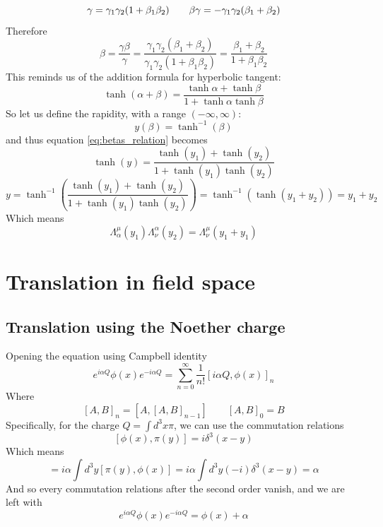 \documentclass{article}
\begin{document}
\begin{equation}
    \gamma = \gamma_1\gamma_2(1 + \beta_1\beta_2) \qquad \-\beta\gamma = -\gamma_1\gamma_2(\beta_1 + \beta_2)
\end{equation}
Therefore
\begin{equation}
\label{eq:betas_relation}
    \beta = \frac{\gamma\beta}{\gamma} = \frac{\gamma_1\gamma_2(\beta_1 + \beta_2)}{\gamma_1\gamma_2(1+\beta_1\beta_2)} = \frac{\beta_1+\beta_2}{1+\beta_1\beta_2}
\end{equation}
This reminds us of the addition formula for hyperbolic tangent:
\begin{equation}
    \tanh(\alpha+\beta) = \frac{\tanh\alpha + \tanh\beta}{1 + \tanh\alpha\tanh\beta}
\end{equation}
So let us define the rapidity, with a range $(-\infty,\infty)$:
\begin{equation}
    y(\beta) = \tanh^{-1}(\beta)
\end{equation}
and thus equation \ref{eq:betas_relation} becomes
\begin{equation}
    \tanh(y) = \frac{\tanh(y_1) + \tanh(y_2)}{1 + \tanh(y_1)\tanh(y_2)}
\end{equation}
\begin{equation}
    y = \tanh^{-1}\left(\frac{\tanh(y_1) + \tanh(y_2)}{1 + \tanh(y_1)\tanh(y_2)}\right) = \tanh^{-1}(\tanh(y_1 + y_2)) = y_1 + y_2
\end{equation}
Which means
\begin{equation}
    \Lambda^\mu_\alpha(y_1)\Lambda^\alpha_\nu(y_2) = \Lambda^\mu_\nu(y_1 + y_1)
\end{equation}

\section{Translation in field space}
\subsection{Translation using the Noether charge}
Opening the equation using Campbell identity
\begin{equation}
    e^{i\alpha Q}\phi(x)e^{-i\alpha Q} = \sum_{n=0}^\infty \frac{1}{n!}\left[i\alpha Q, \phi(x)\right]_n
\end{equation}
Where
\begin{equation}
    \left[A, B\right]_n = [A, [A,B]_{n-1}] \qquad [A,B]_0 = B
\end{equation}
Specifically, for the charge $Q = \int d^3x \pi$, we can use the commutation relations
\begin{equation}
    \left[\phi(x),\pi(y)\right] = i\delta^3(x - y)
\end{equation}
Which means
\begin{equation}
    [i\alpha Q, \phi(x)] = i\alpha \int d^3y [\pi(y), \phi(x)] = i\alpha \int d^3y (-i)\delta^3(x - y) = \alpha
\end{equation}
And so every commutation relations after the second order vanish, and we are left with
\begin{equation}
    e^{i\alpha Q}\phi(x)e^{-i\alpha Q} = \phi(x) + \alpha
\end{equation}
\end{document}
